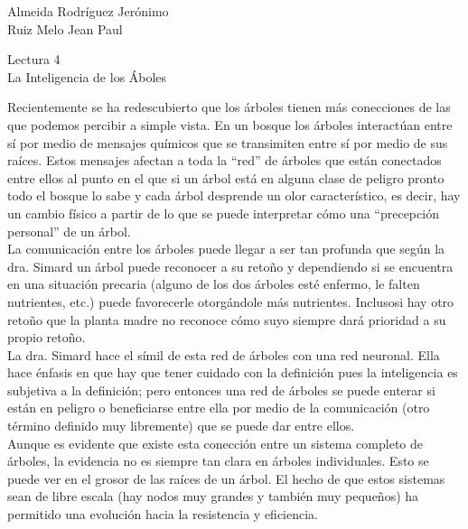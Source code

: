 \documentclass[a4paper, 12pt]{report}
\begin{document}
\begin{flushright}
    Almeida Rodríguez Jerónimo\\
    Ruiz Melo Jean Paul
\end{flushright}

\begin{center}
    {\LARGE Lectura 4}\\
    {\LARGE La Inteligencia de los Áboles}
\end{center}

Recientemente se ha redescubierto que los árboles tienen más conecciones de las
que podemos percibir a simple vista. En un bosque los árboles interactúan entre
sí por medio de mensajes químicos que se transimiten entre sí por medio de sus
raíces. Estos mensajes afectan a toda la ``red'' de árboles que están conectados
entre ellos al punto en el que si un árbol está en alguna clase de peligro
pronto todo el bosque lo sabe y cada árbol desprende un olor característico, es
decir, hay un cambio físico a partir de lo que se puede interpretar cómo una
``precepción personal'' de un árbol.\\

La comunicación entre los árboles puede llegar a ser tan profunda que según la
dra. Simard un árbol puede reconocer a su retoño y dependiendo si se encuentra
en una situación precaria (alguno de los dos árboles esté enfermo, le falten
nutrientes, etc.) puede favorecerle otorgándole más nutrientes. Inclusosi hay
otro retoño que la planta madre no reconoce cómo suyo siempre dará prioridad a
su propio retoño.\\

La dra. Simard hace el símil de esta red de árboles con una red neuronal. Ella
hace énfasis en que hay que tener cuidado con la definición pues la inteligencia
es subjetiva a la definición; pero entonces una red de árboles se puede enterar
si están en peligro o beneficiarse entre ella por medio de la comunicación (otro
término definido muy libremente) que se puede dar entre ellos.\\

Aunque es evidente que existe esta conección entre un sistema completo de
árboles, la evidencia no es siempre tan clara en árboles individuales. Esto se puede ver en el grosor de las raíces de un árbol.  El hecho de que estos
sistemas sean de libre escala (hay nodos muy grandes y también muy pequeños) ha
permitido una evolución hacia la resistencia y eficiencia.
\end{document}
